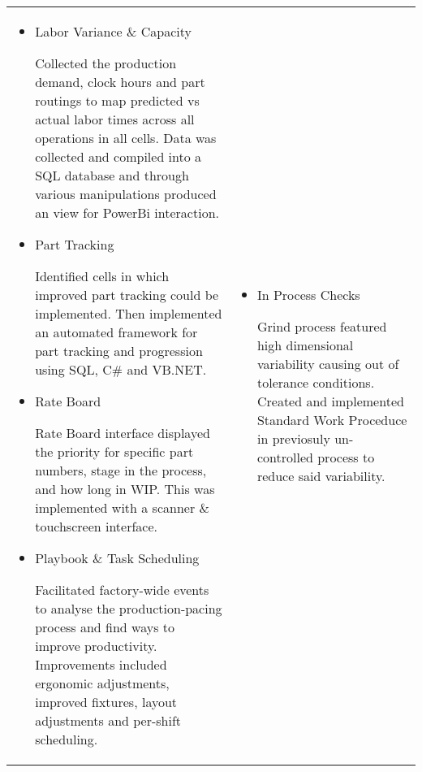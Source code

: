 \documentclass[a4paper, oneside, final, 10pt]{scrartcl} %
\newcommand{\Csharp}{C{\lserif\#}}
\begin{document}
\begin{center}
\vspace{-10pt}
\begin{tabularx}{0.97\linewidth}{X|X}
    \vspace{-10pt}
    \begin{itemize}\setlength\itemsep{0em}
        \item{Labor Variance \&{} Capacity}
        \begin{sloppypar}
            Collected the production demand, clock hours and part routings to map predicted vs actual labor times across all operations in all cells.
            Data was collected and compiled into a SQL database and through various manipulations produced an view for PowerBi interaction.
        \end{sloppypar}
        \item{Part Tracking}
        \begin{sloppypar}
            Identified cells in which improved part tracking could be implemented.
            Then implemented an automated framework for part tracking and progression using SQL, \Csharp{} and VB.NET.
        \end{sloppypar}
        \item {Rate Board}
        \begin{sloppypar}
            Rate Board interface displayed the priority for specific part numbers, stage in the process, and how long in WIP. \@{}
            This was implemented with a scanner \& touchscreen interface.
        \end{sloppypar}
        \item{Playbook \&{} Task Scheduling}
        \begin{sloppypar}
            Facilitated factory-wide events to analyse the production-pacing process and find ways to improve productivity.
            Improvements included ergonomic adjustments, improved fixtures, layout adjustments and per-shift scheduling.
        \end{sloppypar}
    \end{itemize} & \vspace{-10pt} \begin{itemize}\setlength\itemsep{0em}
        \item{In Process Checks}
        \begin{sloppypar}
            Grind process featured high dimensional variability causing out of tolerance conditions.
            Created and implemented Standard Work Proceduce in previosuly un-controlled process to reduce said variability.

\end{sloppypar}
\end{itemize}
\end{tabularx}
\end{center}
\end{document}
